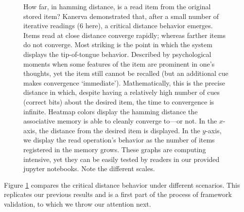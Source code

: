 \begin{figure}[!htb]
\centering


\caption{How far, in hamming distance, is a read item from the original stored item? Kanerva demonstrated that, after a small number of iterative readings (6 here), a critical distance behavior emerges. Items read at close distance converge rapidly; whereas farther items do not converge. Most striking is the point in which the system displays the tip-of-tongue behavior. Described by psychological moments when some features of the item are prominent in one's thoughts, yet the item still cannot be recalled (but an additional cue makes convergence `immediate'). Mathematically, this is the precise distance in which, despite having a relatively high number of cues (correct bits) about the desired item, the time to convergence is infinite.   Heatmap colors display the hamming distance the associative memory is able to cleanly converge to---or not.   In the $x$-axis, the distance from the desired item is displayed. In the $y$-axis, we display the read operation's behavior as the number of items registered in the memory grows.  These graphs are computing intensive, yet they can be easily tested by readers in our provided jupyter notebooks. Note the different scales.}
\label{fig:crit-dist-10k-writes}

\end{figure}

Figure \ref{fig:crit-dist-10k-writes} compares the critical distance behavior under different scenarios.  This replicates our previous results \citep{Brogliato2011, brogliato2014sparse} and is a first part of the process of framework validation, to which we throw our attention next.

